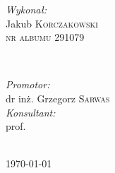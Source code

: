 \documentclass[a4paper,11pt, notitlepage, twoside, openany ]{report}
\begin{document}
\begin{titlepage}
		
		\begin{minipage}{0.4\textwidth}
			\begin{flushleft} \large
				\emph{Wykonał:}\\
				\Large{Jakub \textsc{Korczakowski}} \\
				\textsc{\normalsize{nr albumu 291079}}
			\end{flushleft}
		\end{minipage}
		~
		\begin{minipage}{0.4\textwidth}
			\begin{flushright} \large
				\emph{Promotor:} \\
				dr inż. Grzegorz \textsc{Sarwas} \\[0.5cm] %
								
				\emph{Konsultant:} \\
				prof.  %
			\end{flushright}
		\end{minipage}\\[2cm]
		
		
		
		{\large \today}\\[2cm] %
		
		
		
		
		\vfill %
		
	\end{titlepage}
	\tableofcontents
	\newpage



	\cite{cifar}

	
	 
	
	
	
\end{document}
